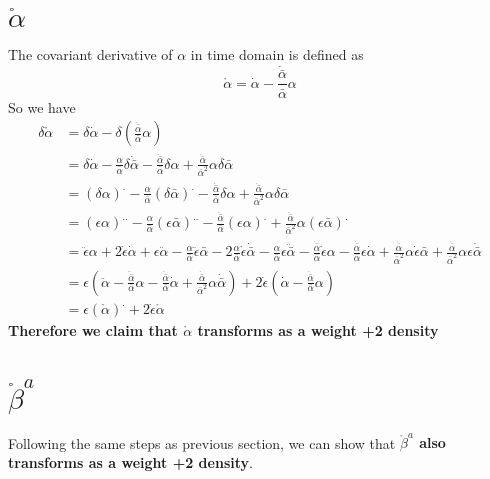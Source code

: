 \documentclass{article}
\begin{document}
\section{$\mathring{\alpha}$}
The covariant derivative of $\alpha$ in time domain is defined as
\[
\mathring{\alpha} = \dot{\alpha} - \frac{\dot{\bar{\alpha}}}{\bar{\alpha}}\alpha
\]
So we have
\begin{align*}
\delta \mathring{\alpha} & = \delta \dot{\alpha} - \delta (\frac{\dot{\bar{\alpha}}}{\bar{\alpha}}\alpha)\\
& = \delta \dot{\alpha} - \frac{\alpha}{\bar{\alpha}}\delta \dot{\bar{\alpha}} - \frac{\dot{\bar{\alpha}}}{\bar{\alpha}}\delta\alpha + \frac{\dot{\bar{\alpha}}}{\bar{\alpha}^2}\alpha \delta \bar{\alpha}\\
& = (\delta \alpha)^{.} - \frac{\alpha}{\bar{\alpha}}(\delta \bar{\alpha})^{.} - \frac{\dot{\bar{\alpha}}}{\bar{\alpha}}\delta\alpha + \frac{\dot{\bar{\alpha}}}{\bar{\alpha}^2}\alpha \delta \bar{\alpha}\\
& = (\epsilon \alpha)^{..} - \frac{\alpha}{\bar{\alpha}}(\epsilon \bar{\alpha})^{..} - \frac{\dot{\bar{\alpha}}}{\bar{\alpha}}(\epsilon\alpha)^{.} + \frac{\dot{\bar{\alpha}}}{\bar{\alpha}^2}\alpha (\epsilon \bar{\alpha})^{.}\\
& = \ddot{\epsilon}\alpha + 2\dot{\epsilon}\dot{\alpha} + \epsilon\ddot{\alpha} -  \frac{\alpha}{\bar{\alpha}}\ddot{\epsilon}\bar{\alpha} - 2 \frac{\alpha}{\bar{\alpha}}\dot{\epsilon}\dot{\bar{\alpha}} -  \frac{\alpha}{\bar{\alpha}}\epsilon\ddot{\bar{\alpha}} - \frac{\dot{\bar{\alpha}}}{\bar{\alpha}} \dot{\epsilon}\alpha - \frac{\dot{\bar{\alpha}}}{\bar{\alpha}}\epsilon\dot{\alpha} +  \frac{\dot{\bar{\alpha}}}{\bar{\alpha}^2}\alpha \dot{\epsilon}\bar{\alpha} +  \frac{\dot{\bar{\alpha}}}{\bar{\alpha}^2}\alpha \epsilon\dot{\bar{\alpha}}\\
& = \epsilon(\ddot{\alpha} - \frac{\ddot{\bar{\alpha}}}{\bar{\alpha}}\alpha - \frac{\dot{\bar{\alpha}}}{\bar{\alpha}}\dot{\alpha} + \frac{\dot{\bar{\alpha}}}{\bar{\alpha}^2}\alpha \dot{\bar{\alpha}}) + 2\dot{\epsilon}(\dot{\alpha} - \frac{\dot{\bar{\alpha}}}{\bar{\alpha}}\alpha)\\
& = \epsilon(\mathring{\alpha})^{.} + 2\dot{\epsilon}\mathring{\alpha}
\end{align*}
{\bf {\color{red} Therefore we claim that $\mathring{\alpha}$ transforms as a weight +2 density}}
\section{$\mathring{\beta}^{a}$}
Following the same steps as previous section, we can show that {\bf {\color{red} $\mathring{\beta}^{a}$ also transforms as a weight +2 density}}.
\end{document}

